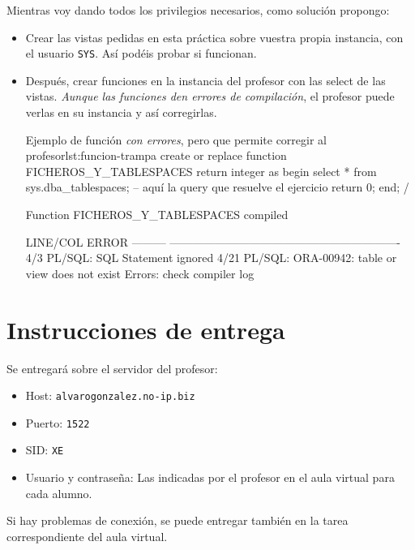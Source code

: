 Mientras voy dando todos los privilegios necesarios, como solución propongo:
\begin{itemize}
\item Crear las vistas pedidas en esta práctica sobre vuestra propia instancia, con el usuario \texttt{SYS}. Así podéis probar si funcionan.
\item Después, crear funciones en la instancia del profesor con las select de las vistas. \textit{Aunque las funciones den errores de compilación}, el profesor puede verlas en su instancia y así corregirlas.

\begin{listadosql}{Ejemplo de función \textit{con errores}, pero que permite corregir al profesor}{lst:funcion-trampa}
create or replace function FICHEROS_Y_TABLESPACES return integer
as
begin
  select * from sys.dba_tablespaces; -- aquí la query que resuelve el ejercicio
  return 0;
end;
/

Function FICHEROS_Y_TABLESPACES compiled

LINE/COL  ERROR
--------- -------------------------------------------------------------
4/3       PL/SQL: SQL Statement ignored
4/21      PL/SQL: ORA-00942: table or view does not exist
Errors: check compiler log
\end{listadosql}
\end{itemize}


\section{Instrucciones de entrega}
Se entregará sobre el servidor del profesor:
\begin{itemize}
\item Host: \texttt{alvarogonzalez.no-ip.biz}
\item Puerto: \texttt{1522}
\item SID: \texttt{XE}
\item Usuario y contraseña: Las indicadas por el profesor en el aula virtual para cada alumno.
\end{itemize}

Si hay problemas de conexión, se puede entregar también en la tarea correspondiente del aula virtual.








